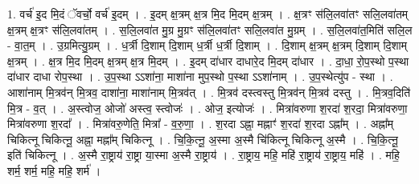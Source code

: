 \documentclass[17pt]{extarticle}
\begin{document}
1. वर्च॑ इ॒द मि॒दं ॅवर्चो॒ वर्च॑ इ॒दम् । . इ॒दम् क्ष॒त्रम् क्ष॒त्र मि॒द मि॒दम् क्ष॒त्रम् । . क्ष॒त्रꣳ स॑लि॒लवा॑तꣳ सलि॒लवा॑तम् क्ष॒त्रम् क्ष॒त्रꣳ स॑लि॒लवा॑तम् । . स॒लि॒लवा॑त मु॒ग्र मु॒ग्रꣳ स॑लि॒लवा॑तꣳ सलि॒लवा॑त मु॒ग्रम् । . स॒लि॒लवा॑त॒मिति॑ सलि॒ल - वा॒त॒म् । . उ॒ग्रमित्यु॒ग्रम् । . ध॒र्त्री दि॒शाम् दि॒शाम् ध॒र्त्री ध॒र्त्री दि॒शाम् । . दि॒शाम् क्ष॒त्रम् क्ष॒त्रम् दि॒शाम् दि॒शाम् क्ष॒त्रम् । . क्ष॒त्र मि॒द मि॒दम् क्ष॒त्रम् क्ष॒त्र मि॒दम् । . इ॒दम् दा॑धार दाधारे॒द मि॒दम् दा॑धार । . दा॒धा॒ रो॒प॒स्थो प॒स्था दा॑धार दाधा रोप॒स्था । . उ॒प॒स्था ऽऽशा॑ना॒ माशा॑ना मुप॒स्थो प॒स्था ऽऽशा॑नाम् । . उ॒प॒स्थेत्यु॑प - स्था । . आशा॑नाम् मि॒त्रव॑न् मि॒त्रव॒ दाशा॑ना॒ माशा॑नाम् मि॒त्रव॑त् । . मि॒त्रव॑ दस्त्वस्तु मि॒त्रव॑न् मि॒त्रव॑ दस्तु । . मि॒त्रव॒दिति॑ मि॒त्र - व॒त् । . अ॒स्त्वोज॒ ओजो॑ अस्त्व॒ स्त्वोजः॑ । . ओज॒ इत्योजः॑ । . मित्रा॑वरुणा श॒रदा॑ श॒रदा॒ मित्रा॑वरुणा॒ मित्रा॑वरुणा श॒रदा᳚ । . मित्रा॑वरु॒णेति॒ मित्रा᳚ - व॒रु॒णा॒ । . श॒रदा ऽह्ना॒ मह्नाꣳ॑ श॒रदा॑ श॒रदा ऽह्ना᳚म् । . अह्ना᳚म् चिकित्नू चिकित्नू॒ अह्ना॒ मह्ना᳚म् चिकित्नू । . चि॒कि॒त्नू॒ अ॒स्मा अ॒स्मै चि॑कित्नू चिकित्नू अ॒स्मै । . चि॒कि॒त्नू॒ इति॑ चिकित्नू । . अ॒स्मै रा॒ष्ट्राय॑ रा॒ष्ट्रा या॒स्मा अ॒स्मै रा॒ष्ट्राय॑ । . रा॒ष्ट्राय॒ महि॒ महि॑ रा॒ष्ट्राय॑ रा॒ष्ट्राय॒ महि॑ । . महि॒ शर्म॒ शर्म॒ महि॒ महि॒ शर्म॑ । \newline
\end{document}
